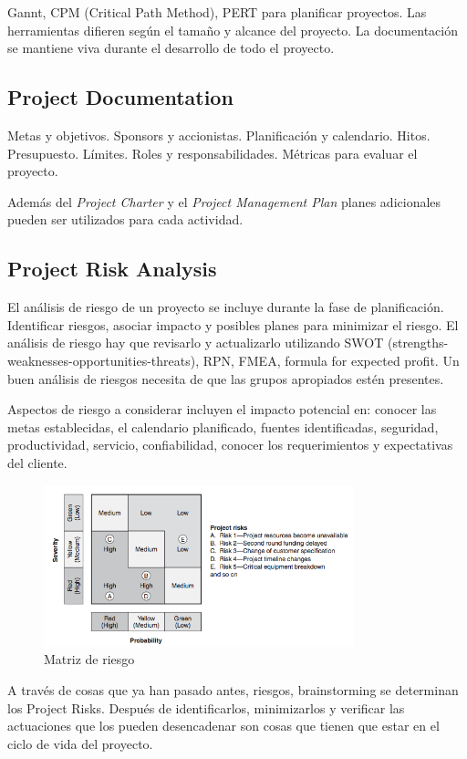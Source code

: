 \documentclass[]{article}
\begin{document}
Gannt, CPM (Critical Path Method), PERT para planificar proyectos.
Las herramientas difieren según el tamaño y alcance del proyecto. La documentación se mantiene viva durante el desarrollo de todo el proyecto.

\subsection{Project Documentation}

Metas y objetivos. Sponsors y accionistas. Planificación y calendario. Hitos. Presupuesto. Límites. Roles y responsabilidades. Métricas para evaluar el proyecto.

Además del \textit{Project Charter} y el \textit{Project Management Plan} planes adicionales pueden ser utilizados para cada actividad.

\subsection{Project Risk Analysis}

El análisis de riesgo de un proyecto se incluye durante la fase de planificación. Identificar riesgos, asociar impacto y posibles planes para minimizar el riesgo. El análisis de riesgo hay que revisarlo y actualizarlo utilizando SWOT (strengths-weaknesses-opportunities-threats), RPN, FMEA, formula for expected profit.
Un buen análisis de riesgos necesita de que las grupos apropiados estén presentes.

Aspectos de riesgo a considerar incluyen el impacto potencial en: conocer las metas establecidas, el calendario planificado, fuentes identificadas, seguridad, productividad, servicio, confiabilidad, conocer los requerimientos y expectativas del cliente.

\begin{figure}[ht!]
	\centering
	\includegraphics[width=90mm]{imagenes/RiskMatrix2.png}
	\caption{Matriz de riesgo}
	\label{fig:RiskMatrix}
\end{figure}

A través de cosas que ya han pasado antes, riesgos, brainstorming se determinan los Project Risks. Después de identificarlos, minimizarlos y verificar las actuaciones que los pueden desencadenar son cosas que tienen que estar en el ciclo de vida del proyecto. 
\end{document}

